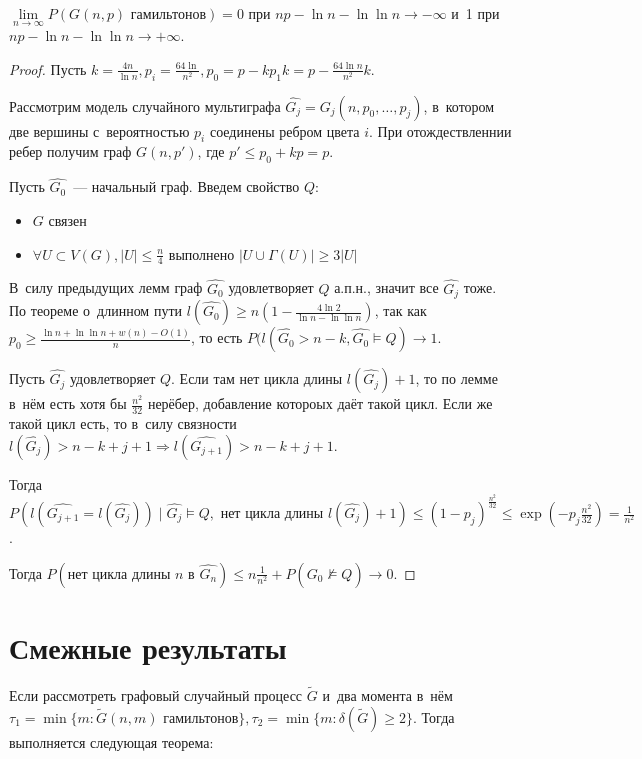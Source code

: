 \documentclass{article}
\begin{document}
\begin{theorem}[о~гамильтоновсти]
	$\lim\limits_{n \rightarrow \infty} P(G(n,p) \text{ гамильтонов}) = 0$ при $np - \ln n - \ln \ln n
	\rightarrow -\infty$ и~1 при $np - \ln n - \ln \ln n \rightarrow +\infty$.
\end{theorem}
\begin{proof}
	Пусть $k = \frac{4n}{\ln n}, p_i = \frac{64\ln}{n^2}, p_0 = p - kp_1k = p - \frac{64\ln n}{n^2}k$.

	Рассмотрим модель случайного мультиграфа $\hat{G_j} = G_j(n, p_0, \ldots, p_j)$, в~котором две
	вершины с~вероятностью $p_i$ соединены ребром цвета $i$. При отождествленнии ребер получим граф
	$G(n, p')$, где $p' \le p_0 + kp = p$.

	Пусть $\hat{G_0}$~--- начальный граф. Введем свойство $Q$:
	\begin{itemize}
		\item $G$ связен
		\item $\forall U \subset V(G), |U| \le \frac{n}{4}$ выполнено $|U \cup \Gamma(U)| \ge 3|U|$
	\end{itemize}

	В~силу предыдущих лемм граф $\hat{G_0}$ удовлетворяет $Q$ а.п.н., значит все $\hat{G_j}$ тоже. По
	теореме о~длинном пути $l(\hat{G_0}) \ge n\left(1 - \frac{4\ln2}{\ln n - \ln \ln n}\right)$, так
	как $p_0 \ge \frac{\ln n + \ln \ln n + w(n) - O(1)}{n}$, то есть $P(l(\hat{G_0} > n - k, \hat{G_0}
	\models Q) \rightarrow 1$.

	Пусть $\hat{G_j}$ удовлетворяет $Q$. Если там нет цикла длины $l(\hat{G_j})+1$, то по лемме в~нём
	есть хотя бы $\frac{n^2}{32}$ нерёбер, добавление котороых даёт такой цикл. Если же такой цикл
	есть, то в~силу связности $l(\hat{G_j}) > n - k + j + 1 \Rightarrow l(\hat{G_{j+1}}) > n - k + j +
	1$.

	Тогда $P(l(\hat{G_{j+1}}=l(\hat{G_j})) \mid \hat{G_j} \models Q, \text{ нет цикла длины }
	l(\hat{G_j})+1) \le (1 - p_j)^\frac{n^2}{32} \le \exp(-p_j \frac{n^2}{32}) = \frac{1}{n^2}$.

	Тогда $P(\text{нет цикла длины } n \text{ в~} \hat{G_n}) \le n\frac{1}{n^2} + P(\hat{G_0}
	\not\models Q) \rightarrow 0$.
\end{proof}

\section{Смежные результаты}

Если рассмотреть графовый случайный процесс $\tilde{G}$ и~два момента в~нём $\tau_1 = \min\{m:
\tilde{G}(n,m) \text{ гамильтонов}\}, \tau_2 = \min\{m: \delta(\tilde{G}) \ge 2\}$. Тогда
выполняется следующая теорема:
\end{document}
